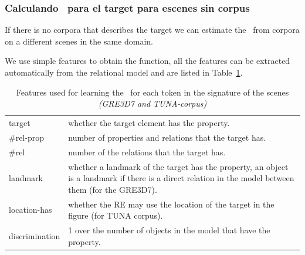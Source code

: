 \subsubsection{Calculando \puse\ para el target para escenes sin corpus } \label{subsec:learning}

If there is no corpora that describes the target we can estimate the
\puse~from corpora on a different scenes in the same domain.

We use simple features to obtain the function, all the features can be
extracted automatically from the relational model and are listed in
Table~\ref{features}.

\begin{small}
\begin{table}[h!]
\begin{center}
\begin{tabular}{|l|p{10cm}|}
\hline
target & whether the target element has the property. \\
\#rel-prop & number of properties and relations that the target has.\\
\#rel & number of the relations that the target has. \\
landmark & whether a landmark of the target has the property, an object is a landmark if there is a direct relation in the model 
between them (for the GRE3D7).\\
location-has & whether the RE may use the location of the target in the figure (for TUNA corpus).\\
discrimination & 1 over the number of objects in the model that have the property.  \\
\hline
\end{tabular}
\caption{Features used for learning the \puse ~for each token in the signature of the scenes \textit{(GRE3D7 and TUNA-corpus)} \label{features}}
\end{center}
\end{table}
\end{small}

